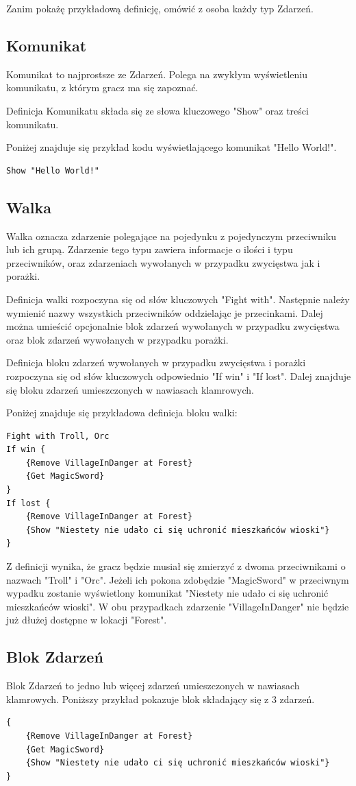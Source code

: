 \documentclass	{xmgr}
\begin{document}
Zanim pokażę przykładową definicję, omówić z osoba każdy typ Zdarzeń.
\subsection*{Komunikat}
Komunikat to najprostsze ze Zdarzeń. Polega na zwykłym wyświetleniu komunikatu, z którym gracz ma się zapoznać.

Definicja Komunikatu składa się ze słowa kluczowego "Show" oraz treści komunikatu.

Poniżej znajduje się przykład kodu wyświetlającego komunikat "Hello World!".
\begin{lstlisting}
Show "Hello World!"
\end{lstlisting}
\subsection*{Walka}
Walka oznacza zdarzenie polegające na pojedynku z pojedynczym przeciwniku lub ich grupą. Zdarzenie tego typu zawiera informacje o ilości i typu przeciwników, oraz zdarzeniach wywołanych w przypadku zwycięstwa jak i porażki.

Definicja walki rozpoczyna się od słów kluczowych "Fight with". Następnie należy wymienić nazwy wszystkich przeciwników oddzielając je przecinkami. Dalej można umieścić opcjonalnie blok zdarzeń wywołanych w przypadku zwycięstwa oraz blok zdarzeń wywołanych w przypadku porażki.

Definicja bloku zdarzeń wywołanych w przypadku zwycięstwa i porażki rozpoczyna się od słów kluczowych odpowiednio "If win" i "If lost". Dalej znajduje się bloku zdarzeń umieszczonych w nawiasach klamrowych.

Poniżej znajduje się przykładowa definicja bloku walki:
\begin{lstlisting}
Fight with Troll, Orc
If win {
	{Remove VillageInDanger at Forest}
	{Get MagicSword}
}
If lost {
	{Remove VillageInDanger at Forest}
	{Show "Niestety nie udało ci się uchronić mieszkańców wioski"}
}
\end{lstlisting}
Z definicji wynika, że gracz będzie musiał się zmierzyć z dwoma przeciwnikami o nazwach "Troll" i "Orc". Jeżeli ich pokona zdobędzie "MagicSword" w przeciwnym wypadku zostanie wyświetlony komunikat "Niestety nie udało ci się uchronić mieszkańców wioski". W obu przypadkach zdarzenie "VillageInDanger" nie będzie już dłużej dostępne w lokacji "Forest".

\subsection*{Blok Zdarzeń}
Blok Zdarzeń to jedno lub więcej zdarzeń umieszczonych w nawiasach klamrowych.
Poniższy przykład pokazuje blok składający się z 3 zdarzeń.
\begin{lstlisting}
{
	{Remove VillageInDanger at Forest}
	{Get MagicSword}
	{Show "Niestety nie udało ci się uchronić mieszkańców wioski"}
}
\end{lstlisting}
\end{document}
